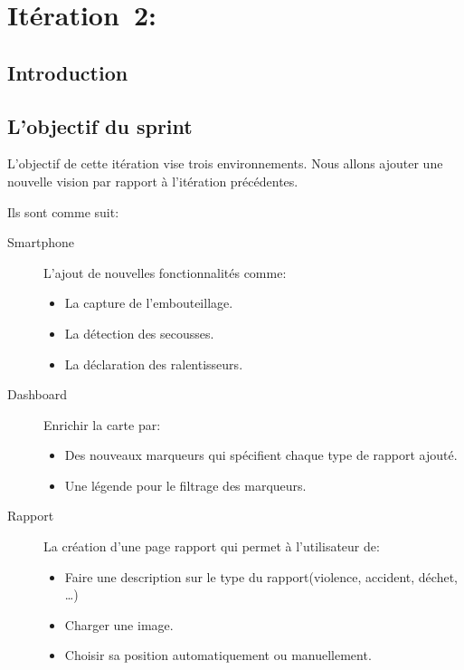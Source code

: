 \section[Itération 2: ( 3/8/2017 - 3/28/2017 )]{Itération~2:~\textup{}}

\subsection{Introduction}

\subsection{L'objectif du sprint}

L'objectif de cette itération vise trois environnements. Nous allons ajouter
une nouvelle vision par rapport à l'itération précédentes.

Ils sont comme suit:

\begin{description}
    \item [Smartphone] L'ajout de nouvelles fonctionnalités comme:
        \begin{itemize}
            \item La capture de l'embouteillage.
            \item La détection des secousses.
            \item La déclaration des ralentisseurs.
        \end{itemize}
    \item [Dashboard] Enrichir la carte par:
        \begin{itemize}
            \item Des nouveaux marqueurs qui spécifient chaque type de rapport
                ajouté.
            \item Une légende pour le filtrage des marqueurs.
        \end{itemize}
    \item [Rapport] La création d'une page rapport qui permet à l'utilisateur
        de:
        \begin{itemize}
            \item Faire une description sur le type du rapport(violence,
                accident, déchet, \ldots)
            \item Charger une image.
            \item Choisir sa position automatiquement ou manuellement.
        \end{itemize}
\end{description}

